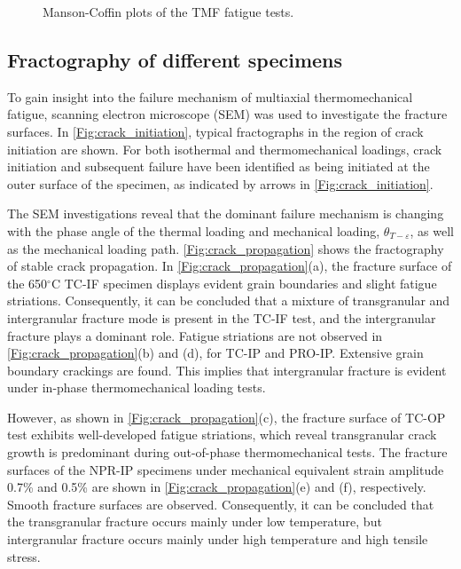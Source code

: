\begin{figure}[!htp]
  \caption{Manson-Coffin plots of the TMF fatigue tests.}
  \label{Fig:plot_exp_fatigue_life}
\end{figure}

\subsection{Fractography of different specimens}
\noindent
To gain insight into the failure mechanism of multiaxial thermomechanical fatigue, scanning electron microscope (SEM) was used to investigate the fracture surfaces. In \ref{Fig:crack_initiation}, typical fractographs in the region of crack initiation are shown. For both isothermal and thermomechanical loadings, crack initiation and subsequent failure have been identified as being initiated at the outer surface of the specimen, as indicated by arrows in \ref{Fig:crack_initiation}.

The SEM investigations reveal that the dominant failure mechanism is changing with the phase angle of the thermal loading and mechanical loading, $\theta_{T-\varepsilon}$, as well as the mechanical loading path.
\ref{Fig:crack_propagation} shows the fractography of stable crack propagation.
In \ref{Fig:crack_propagation}(a), the fracture surface of the 650$^\circ$C TC-IF specimen displays evident grain boundaries and slight fatigue striations. Consequently, it can be concluded that a mixture of transgranular and intergranular fracture mode is present in the TC-IF test, and the intergranular fracture plays a dominant role.
Fatigue striations are not observed in \ref{Fig:crack_propagation}(b) and (d), for TC-IP and PRO-IP. Extensive grain boundary crackings are found. This implies that intergranular fracture is evident under in-phase thermomechanical loading tests.

However, as shown in \ref{Fig:crack_propagation}(c), the fracture surface of TC-OP test exhibits well-developed fatigue striations, which reveal transgranular crack growth is predominant during out-of-phase thermomechanical tests.
The fracture surfaces of the NPR-IP specimens under mechanical equivalent strain amplitude 0.7\% and 0.5\% are shown in \ref{Fig:crack_propagation}(e) and (f), respectively. Smooth fracture surfaces are observed.
Consequently, it can be concluded that the transgranular fracture occurs mainly under low temperature, but intergranular fracture occurs mainly under high temperature and high tensile stress.

